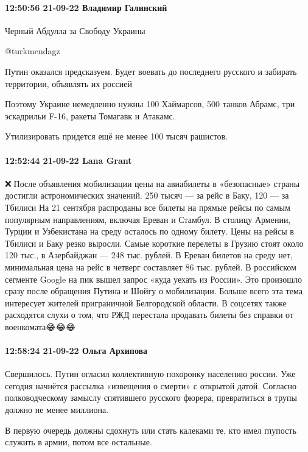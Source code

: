 \paragraph{12:50:56 21-09-22 Владимир Галинский}

Черный Абдулла за Свободу Украины

@turkmendagz

Путин оказался предсказуем. Будет воевать до последнего русского и забирать территории, объявлять их россией

Поэтому Украине немедленно нужны 100 Хаймарсов, 500 танков Абрамс, три эскадрильи F-16, ракеты Томагавк и Атакамс.

Утилизировать придется ещё не менее 100 тысяч рашистов.

\paragraph{12:52:44 21-09-22 Lana Grant}

❌🛫После объявления мобилизации цены на авиабилеты в «безопасные» страны достигли астрономических значений. 250 тысяч — за рейс в Баку, 120 — за Тбилиси
На 21 сентября распроданы все билеты на прямые рейсы по самым популярным направлениям, включая Ереван и Стамбул. В столицу Армении, Турции и Узбекистана на среду осталось по одному билету. Цены на рейсы в Тбилиси и Баку резко выросли. Самые короткие перелеты в Грузию стоят около 120 тыс., в Азербайджан — 248 тыс. рублей. В Ереван билетов на среду нет, минимальная цена на рейс в четверг составляет 86 тыс. рублей.
В российском сегменте Google на пик вышел запрос «куда уехать из России». Это произошло сразу после обращения Путина и Шойгу о мобилизации. Больше всего эта тема интересует жителей приграничной Белгородской области.
В соцсетях также расходятся слухи о том, что РЖД перестала продавать билеты без справки от военкомата😂😂😂

\paragraph{12:58:24 21-09-22 Ольга Архипова}

Свершилось. Путин огласил коллективную похоронку населению россии. Уже сегодня
начнётся рассылка «извещения о смерти» с открытой датой. Согласно
полководческому замыслу спятившего русского фюрера, превратиться в трупы должно
не менее миллиона.

В первую очередь должны сдохнуть или стать калеками те, кто имел глупость
служить в армии, потом все остальные.

